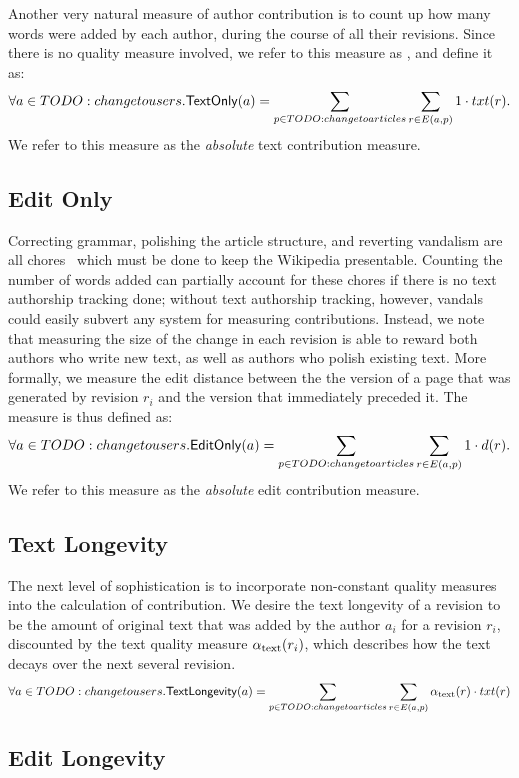 \noindent
Another very natural measure of author contribution
is to count up how many words were added by each author,
during the course of all their revisions.
Since there is no quality measure involved,
we refer to this measure as \textonly,
and define it as:
%
\[
\forall a \in TODO: change to users .
\mathsf{TextOnly}(a) = \sum_{p \in TODO: change to articles} \sum_{r \in E(a, p)} 1 \cdot txt(r).
\]
%
We refer to this measure as the {\em absolute\/} text contribution
measure.

\subsection{Edit Only}

\noindent
Correcting grammar, polishing the article structure,
and reverting vandalism are all chores~\cite{AdministratorMop2008}
which must be done to keep the Wikipedia presentable.
Counting the number of words added can partially account
for these chores if there is no text authorship tracking done;
without text authorship tracking, however, vandals could
easily subvert any system for measuring contributions.
Instead, we note that measuring the size of the change
in each revision is able to reward both authors who write
new text, as well as authors who polish existing text.
More formally, we measure the edit distance between the
the version of a page that was generated by revision $r_i$
and the version that immediately preceded it.
The \editonly measure is thus defined as:
%
\[
\forall a \in TODO: change to users .
\mathsf{EditOnly}(a) = \sum_{p \in TODO: change to articles} \sum_{r \in E(a, p)} 1 \cdot d(r).
\]
%
We refer to this measure as the {\em absolute\/} edit contribution
measure.

\subsection{Text Longevity}

\noindent
The next level of sophistication is to incorporate
non-constant quality measures into the calculation of contribution.
We desire the text longevity of a revision to be
the amount of original text that was
added by the author $a_i$ for a revision $r_i$, discounted by the
text quality measure $\alpha_\text{text}(r_i)$, which describes
how the text decays over the next several revision.
%
\[
\forall a \in TODO: change to users .
\mathsf{TextLongevity}(a) = 
\sum_{p \in TODO: change to articles} \sum_{r \in E(a, p)} \alpha_\text{text}(r) \cdot txt(r)
\]
%

\subsection{Edit Longevity}

